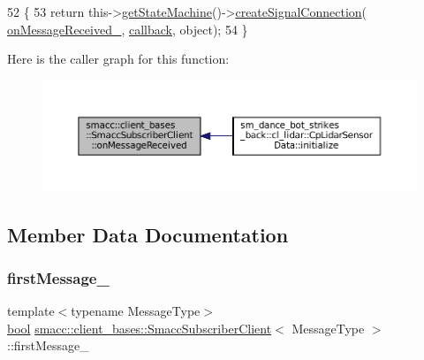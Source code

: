 \begin{DoxyCode}
52   \{
53     \textcolor{keywordflow}{return} this->\hyperlink{classsmacc_1_1ISmaccClient_aec51d4712404cb9882b86e4c854bb93a}{getStateMachine}()->\hyperlink{classsmacc_1_1ISmaccStateMachine_adf0f42ade0c65cc471960fe2a7c42da2}{createSignalConnection}(
      \hyperlink{classsmacc_1_1client__bases_1_1SmaccSubscriberClient_a04469577ec95e2f6c04cd4dca87dfc08}{onMessageReceived\_}, \hyperlink{servers_2opencv__perception__node_2opencv__perception__node_8cpp_a050e697bd654facce10ea3f6549669b3}{callback}, \textcolor{keywordtype}{object});
54   \}
\end{DoxyCode}
Here is the caller graph for this function\+:
\nopagebreak
\begin{figure}[H]
\begin{center}
\leavevmode
\includegraphics[width=350pt]{classsmacc_1_1client__bases_1_1SmaccSubscriberClient_a4f02251e3a161fb6d802b154b1081f18_icgraph}
\end{center}
\end{figure}


\subsection{Member Data Documentation}
\mbox{\label{classsmacc_1_1client__bases_1_1SmaccSubscriberClient_a1283e89a0d33a9028a5042519c6869a6}} 
\subsubsection{\texorpdfstring{first\+Message\+\_\+}{firstMessage\_}}
{\footnotesize\ttfamily template$<$typename Message\+Type$>$ \\
\hyperlink{classbool}{bool} \hyperlink{classsmacc_1_1client__bases_1_1SmaccSubscriberClient}{smacc\+::client\+\_\+bases\+::\+Smacc\+Subscriber\+Client}$<$ Message\+Type $>$\+::first\+Message\+\_\+\hspace{0.3cm}{\ttfamily [private]}}



